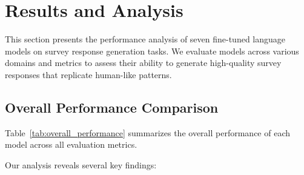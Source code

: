 \documentclass[11pt]{article}
\begin{document}
\section{Results and Analysis}

This section presents the performance analysis of seven fine-tuned language models on survey response generation tasks. We evaluate models across various domains and metrics to assess their ability to generate high-quality survey responses that replicate human-like patterns.

\subsection{Overall Performance Comparison}

Table~\ref{tab:overall_performance} summarizes the overall performance of each model across all evaluation metrics.

\begin{table}[t]
\centering
{}
\caption{Overall performance comparison across models. BScore = BERTScore F1, SQ = Survey Quality, SS = Sentiment Similarity.}
\label{tab:overall_performance}
\end{table}

Our analysis reveals several key findings:
\end{document}
